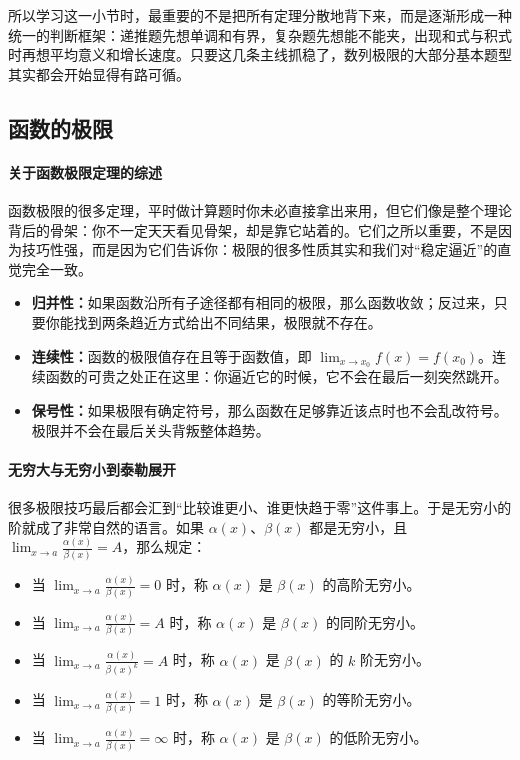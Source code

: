 \documentclass[UTF8]{ctexbook}
\begin{document}
所以学习这一小节时，最重要的不是把所有定理分散地背下来，而是逐渐形成一种统一的判断框架：递推题先想单调和有界，复杂题先想能不能夹，出现和式与积式时再想平均意义和增长速度。只要这几条主线抓稳了，数列极限的大部分基本题型其实都会开始显得有路可循。

\subsection{函数的极限}
\paragraph{关于函数极限定理的综述}
函数极限的很多定理，平时做计算题时你未必直接拿出来用，但它们像是整个理论背后的骨架：你不一定天天看见骨架，却是靠它站着的。它们之所以重要，不是因为技巧性强，而是因为它们告诉你：极限的很多性质其实和我们对“稳定逼近”的直觉完全一致。
\begin{itemize}
  \item \textbf{归并性：}如果函数沿所有子途径都有相同的极限，那么函数收敛；反过来，只要你能找到两条趋近方式给出不同结果，极限就不存在。
  \item \textbf{连续性：}函数的极限值存在且等于函数值，即 $\lim_{x\to x_0}f(x)=f(x_0)$。连续函数的可贵之处正在这里：你逼近它的时候，它不会在最后一刻突然跳开。
  \item \textbf{保号性：}如果极限有确定符号，那么函数在足够靠近该点时也不会乱改符号。极限并不会在最后关头背叛整体趋势。
\end{itemize}

\paragraph{无穷大与无穷小到泰勒展开}
很多极限技巧最后都会汇到“比较谁更小、谁更快趋于零”这件事上。于是无穷小的阶就成了非常自然的语言。如果 $\alpha(x)$、$\beta(x)$ 都是无穷小，且 $\lim_{x\to a}\frac{\alpha(x)}{\beta(x)}=A$，那么规定：
\begin{itemize}
  \item 当 $\lim_{x\to a}\frac{\alpha(x)}{\beta(x)}=0$ 时，称 $\alpha(x)$ 是 $\beta(x)$ 的高阶无穷小。
  \item 当 $\lim_{x\to a}\frac{\alpha(x)}{\beta(x)}=A$ 时，称 $\alpha(x)$ 是 $\beta(x)$ 的同阶无穷小。
  \item 当 $\lim_{x\to a}\frac{\alpha(x)}{\beta(x)^k}=A$ 时，称 $\alpha(x)$ 是 $\beta(x)$ 的 $k$ 阶无穷小。
  \item 当 $\lim_{x\to a}\frac{\alpha(x)}{\beta(x)}=1$ 时，称 $\alpha(x)$ 是 $\beta(x)$ 的等阶无穷小。
  \item 当 $\lim_{x\to a}\frac{\alpha(x)}{\beta(x)}=\infty$ 时，称 $\alpha(x)$ 是 $\beta(x)$ 的低阶无穷小。
\end{itemize}
\end{document}
